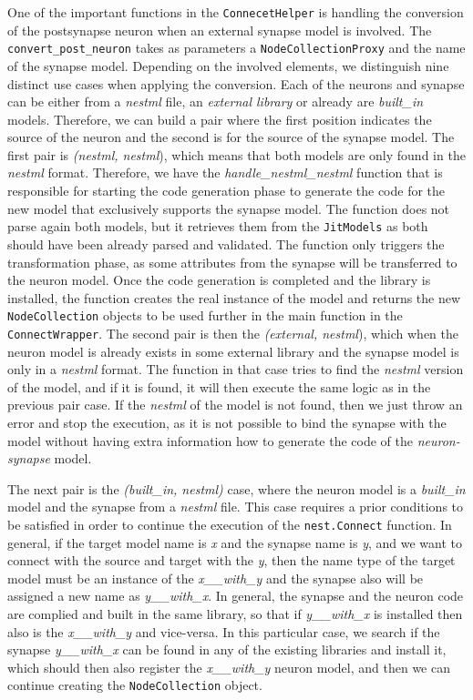 One of the important functions in the \texttt{ConnecetHelper} is handling the conversion of the postsynapse neuron when an external synapse model is involved. The \texttt{convert\_post\_neuron} takes as parameters a \texttt{NodeCollectionProxy} and the name of the synapse model. Depending on the involved elements, we distinguish nine distinct use cases when applying the conversion. Each of the neurons and synapse can be either from a \emph{nestml} file, an \emph{external library} or already are \emph{built\_in} models. Therefore, we can build a pair where the first position indicates the source of the neuron and the second is for the source of the synapse model. The first pair is \emph{(nestml, nestml}), which means that both models are only found in the \emph{nestml} format. Therefore, we have the  \emph{handle\_nestml\_nestml} function that is responsible for starting the code generation phase to generate the code for the new model that exclusively supports the synapse model. The function does not parse again both models, but it retrieves them from the \texttt{JitModels} as both should have been already parsed and validated. The function only triggers the transformation phase, as some attributes from the synapse will be transferred to the neuron model. Once the code generation is completed and the library is installed, the function creates the real instance of the model and returns the new \texttt{NodeCollection} objects to be used further in the main function in the \texttt{ConnectWrapper}. The second pair is then the \emph{(external, nestml}), which when the neuron model is already exists in some external library and the synapse model is only in a \emph{nestml} format. The function in that case tries to find the \emph{nestml} version of the model, and if it is found, it will then execute the same logic as in the previous pair case. If the \emph{nestml} of the model is not found, then we just throw an error and stop the execution, as it is not possible to bind the synapse with the model without having extra information how to generate the code of the \emph{neuron-synapse} model. 

The next pair is the \emph{(built\_in, nestml)} case, where the neuron model is a \emph{built\_in} model and the synapse from a \emph{nestml} file. This case requires a prior conditions to be satisfied in order to continue the execution of the \texttt{nest.Connect} function. In general, if the target model name is \emph{x} and the synapse name is \emph{y}, and we want to connect with the source and target with the \emph{y}, then the name type of the target model must be an instance of the \emph{x\_\_with\_y} and the synapse also will be assigned a new name as \emph{y\_\_with\_x}. In general, the synapse and the neuron code are complied and built in the same library, so that if \emph{y\_\_with\_x} is installed then also is the \emph{x\_\_with\_y} and vice-versa. In this particular case, we search if the  synapse \emph{y\_\_with\_x} can be found in any of the existing libraries and install it, which should then also register the \emph{x\_\_with\_y} neuron model, and then we can continue creating the \texttt{NodeCollection} object.



